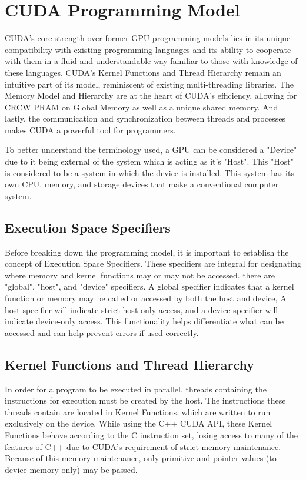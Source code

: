 \documentclass[11pt]{report}
\begin{document}
\section{CUDA Programming Model}
CUDA's core strength over former GPU programming models lies in its unique compatibility with existing programming languages and its ability to cooperate with them in a fluid and understandable way familiar to those with knowledge of these languages. CUDA's Kernel Functions and Thread Hierarchy remain an intuitive part of its model, reminiscent of existing multi-threading libraries. The Memory Model and Hierarchy are at the heart of CUDA's efficiency, allowing for CRCW PRAM on Global Memory as well as a unique shared memory. And lastly, the communication and synchronization between threads and processes makes CUDA a powerful tool for programmers.

To better understand the terminology used, a GPU can be considered a "Device" due to it being external of the system which is acting as it's "Host". This "Host" is considered to be a system in which the device is installed. This system has its own CPU, memory, and storage devices that make a conventional computer system.

    \subsection{Execution Space Specifiers}
    Before breaking down the programming model, it is important to establish the concept of Execution Space Specifiers. These specifiers are integral for designating where memory and kernel functions may or may not be accessed. there are "global", "host", and "device" specifiers. A global specifier indicates that a kernel function or memory may be called or accessed by both the host and device, A host specifier will indicate strict host-only access, and a device specifier will indicate device-only access. This functionality helps differentiate what can be accessed and can help prevent errors if used correctly.

    \subsection{Kernel Functions and Thread Hierarchy}
    In order for a program to be executed in parallel, threads containing the instructions for execution must be created by the host. The instructions these threads contain are located in Kernel Functions, which are written to run exclusively on the device. While using the C++ CUDA API, these Kernel Functions behave according to the C instruction set, losing access to many of the features of C++ due to CUDA's requirement of strict memory maintenance. Because of this memory maintenance, only primitive and pointer values (to device memory only) may be passed.
    
\end{document}
